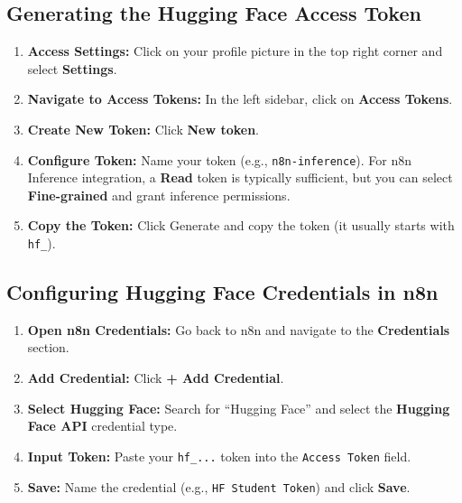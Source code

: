 \documentclass[12pt,a4paper]{article}
\begin{document}
\subsection{Generating the Hugging Face Access Token}
\begin{enumerate}[label=\textbf{Step \arabic*.}]
    \item \textbf{Access Settings:} Click on your profile picture in the top right corner and select \textbf{Settings}.
    \item \textbf{Navigate to Access Tokens:} In the left sidebar, click on \textbf{Access Tokens}.
    \item \textbf{Create New Token:} Click \textbf{New token}.
    \item \textbf{Configure Token:} Name your token (e.g., \texttt{n8n-inference}). For n8n Inference integration, a \textbf{Read} token is typically sufficient, but you can select \textbf{Fine-grained} and grant inference permissions.
    \item \textbf{Copy the Token:} Click Generate and copy the token (it usually starts with \texttt{hf\_}).
\end{enumerate}

\subsection{Configuring Hugging Face Credentials in n8n}
\begin{enumerate}[label=\textbf{Step \arabic*.}]
    \item \textbf{Open n8n Credentials:} Go back to n8n and navigate to the \textbf{Credentials} section.
    \item \textbf{Add Credential:} Click \textbf{+ Add Credential}.
    \item \textbf{Select Hugging Face:} Search for ``Hugging Face'' and select the \textbf{Hugging Face API} credential type.
    \item \textbf{Input Token:} Paste your \texttt{hf\_...} token into the \texttt{Access Token} field.
    \item \textbf{Save:} Name the credential (e.g., \texttt{HF Student Token}) and click \textbf{Save}.
\end{enumerate}
\end{document}
